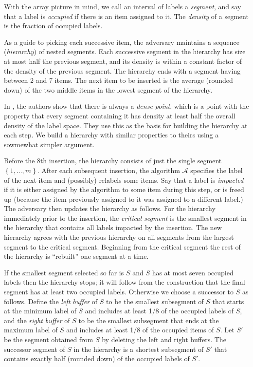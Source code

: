 \documentclass[unicode,review]{siamart1116}
\newcommand{\A}{\mathcal{A}}
\newcommand{\natInt}[2]{ \left\{ #1, \dotsc, #2 \right\} }
\numberwithin{theorem}{section}
\begin{document}
With the array picture in mind,
we  call an interval of labels a \emph{segment}, and say that a label is {\em occupied} if there is an item assigned to it.
The \emph{density} of a segment is the fraction of occupied labels.

As a guide to picking each successive item, the adversary maintains a sequence (\emph{hierarchy}) of nested segments.  Each successive segment in the hierarchy
has size at most half the previous segment, and its density  is within a constant factor of the density of the previous segment.
The hierarchy ends with a segment having between 2 and 7 items.  The next item to be inserted is the average (rounded down)
of the two middle items in the lowest segment of the hierarchy.

In \cite{DSZ04}, the authors show that there is always a \emph{dense point}, which is
a point  with the property that every segment containing it
has density at least half the overall density of the label space.  They use this as the basis for building the hierarchy at each
step.
We build a hierarchy with similar properties to theirs using a sowmewhat simpler argument.


Before the 8th insertion, the hierarchy consists of just the single segment $\natInt{1}{m}$.
After each subsequent insertion,
the algorithm $\A$ specifies the label of the next item and (possibly) relabels some items. Say that a label is {\em impacted} if
it is either assigned by the algorithm to some item during this step, or is freed up (because the item previously
assigned to it was  assigned to a different label.) The adversary then updates the hierarchy as follows.  For the hierarchy immediately prior to the insertion, the {\em critical segment} is the smallest segment in the hierarchy that contains all 
labels impacted by the insertion.
The new hierarchy agrees with the previous hierarchy on all segments from the largest segment to 
the critical segment.   Beginning from the critical segment the rest of the hierarchy is ``rebuilt'' one segment at a time.

If the smallest segment selected so far is $S$ and $S$ has at most seven occupied labels then
the hierarchy stops; it will follow from the construction that the final segment has at least
two occupied labels.  Otherwise we choose a successor to $S$ as follows.
Define the
{\em left buffer} of $S$
to be the smallest subsegment of $S$ that starts at the minimum label of $S$ and
includes at least 1/8 of the occupied labels of $S$, and the {\em right buffer} of $S$ to be the smallest subsegment that ends at the maximum label of $S$
and includes at least 1/8 of the occupied items of $S$.
Let $S'$ be the segment obtained from $S$ by
deleting the left and right buffers. The successor segment of $S$ in the hierarchy is
a shortest subsegment of $S'$ that contains exactly half (rounded down) of the occupied labels of $S'$.
\end{document}
